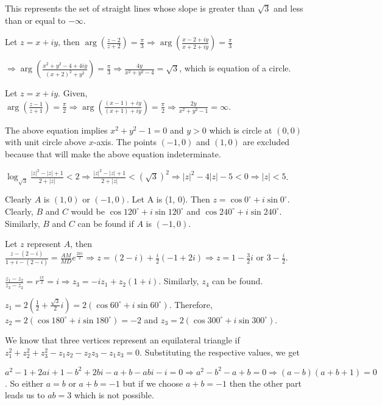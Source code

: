   This represents the set of straight lines whose slope is greater than $\sqrt{3}$ and less than or equal
  to $-\infty$.
\item Let $z = x + iy$, then $\arg\left(\frac{z - 2}{z + 2}\right) = \frac{\pi}{3} \Rightarrow
  \arg\left(\frac{x - 2 + iy}{x + 2 + iy}\right) = \frac{\pi}{3}$

  $\Rightarrow \arg\left(\frac{x^2 + y^2 - 4 + 4iy}{(x + 2)^2 + y^2}\right) = \frac{\pi}{3}\Rightarrow
  \frac{4y}{x^2 + y^2 - 4} = \sqrt{3}$, which is equation of a circle.
\item Let $z = x + iy$. Given, $\arg\left(\frac{z - 1}{z + 1}\right) = \frac{\pi}{2} \Rightarrow
  \arg\left(\frac{(x - 1) + iy}{(x + 1) + iy}\right) = \frac{\pi}{2} \Rightarrow \frac{2y}{x^2 + y^2 - 1} =
  \infty$.

  The above equation implies $x^2 + y^2 - 1 = 0$ and $y > 0$ which is circle at $(0, 0)$ with unit circle
  above $x$-axis. The points $(-1, 0)$ and $(1, 0)$ are excluded because that will make the above equation
  indeterminate.
\item $\log_{\sqrt{3}}\frac{|z|^2 - |z| + 1}{2 + |z|} < 2\Rightarrow \frac{|z|^2 - |z| + 1}{2 + |z|} <
  (\sqrt{3})^2\Rightarrow |z|^2 - 4|z| - 5 < 0\Rightarrow |z| < 5$.
\item Clearly $A$ is $(1, 0)$ or $(-1, 0)$. Let A is (1, 0). Then $z = \cos0^\circ + i\sin0^\circ.$ Clearly,
  $B$ and $C$ would be $\cos120^\circ + i\sin120^\circ$ and $\cos240^\circ + i\sin240^\circ$. Similarly, $B$
  and $C$ can be found if $A$ is $(-1, 0)$.
\item Let $z$ represent $A$, then $\frac{z - (2 - i)}{1 + i - (2 - i)} = \frac{AM}{MD}e^{\frac{2\pi i}{2}}
  \Rightarrow z = (2 - i) + \frac{i}{2}(-1 + 2i) \Rightarrow z = 1 - \frac{3}{2}i$ or $3 -\frac{i}{2}$.
\item $\frac{z_1 - z_2}{z_3 - z_2} = r^{\frac{i\pi}{2}} = i\Rightarrow z_3 = -iz_1 + z_2(1 + i)$. Similarly,
  $z_4$ can be found.
\item $z_1 =2\left(\frac{1}{2} + \frac{\sqrt{3}}{2}i\right) = 2(\cos60^\circ + i\sin60^\circ)$. Therefore,
  $z_2 = 2(\cos180^\circ + i\sin180^\circ) = -2$ and $z_3 = 2(\cos300^\circ + i\sin300^\circ)$.
\item We know that three vertices represent an equilateral triangle if $z_1^2 + z_2^2 + z_3^2 - z_1z_2 -
  z_2z_3 -z_1z_3 = 0.$ Substituting the respective values, we get

  $a^2 - 1 + 2ai + 1 - b^2 + 2bi - a + b - abi - i = 0 \Rightarrow a^2 - b^2 - a + b = 0 \Rightarrow (a -
  b)(a + b + 1) = 0$. So either $a = b$ or $a + b = -1$ but if we choose $a + b = -1$ then the other part
  leads us to $ab = 3$ which is not possible.


